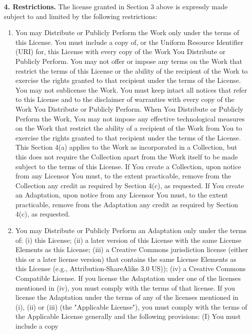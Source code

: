 \noindent \textbf{4. Restrictions.} The license granted in Section 3 above is
expressly made subject to and limited by the following
restrictions:

\begin{enumerate}
\item
  You may Distribute or Publicly Perform the Work only under the
  terms of this License. You must include a copy of, or the Uniform
  Resource Identifier (URI) for, this License with every copy of the
  Work You Distribute or Publicly Perform. You may not offer or
  impose any terms on the Work that restrict the terms of this
  License or the ability of the recipient of the Work to exercise the
  rights granted to that recipient under the terms of the License.
  You may not sublicense the Work. You must keep intact all notices
  that refer to this License and to the disclaimer of warranties with
  every copy of the Work You Distribute or Publicly Perform. When You
  Distribute or Publicly Perform the Work, You may not impose any
  effective technological measures on the Work that restrict the
  ability of a recipient of the Work from You to exercise the rights
  granted to that recipient under the terms of the License. This
  Section 4(a) applies to the Work as incorporated in a Collection,
  but this does not require the Collection apart from the Work itself
  to be made subject to the terms of this License. If You create a
  Collection, upon notice from any Licensor You must, to the extent
  practicable, remove from the Collection any credit as required by
  Section 4(c), as requested. If You create an Adaptation, upon
  notice from any Licensor You must, to the extent practicable,
  remove from the Adaptation any credit as required by Section 4(c),
  as requested.
\item
  You may Distribute or Publicly Perform an Adaptation only under the
  terms of: (i) this License; (ii) a later version of this License
  with the same License Elements as this License; (iii) a Creative
  Commons jurisdiction license (either this or a later license
  version) that contains the same License Elements as this License
  (e.g., Attribution-ShareAlike 3.0 US)); (iv) a Creative Commons
  Compatible License. If you license the Adaptation under one of the
  licenses mentioned in (iv), you must comply with the terms of that
  license. If you license the Adaptation under the terms of any of
  the licenses mentioned in (i), (ii) or (iii) (the "Applicable
  License"), you must comply with the terms of the Applicable License
  generally and the following provisions: (I) You must include a copy

\end{enumerate}
